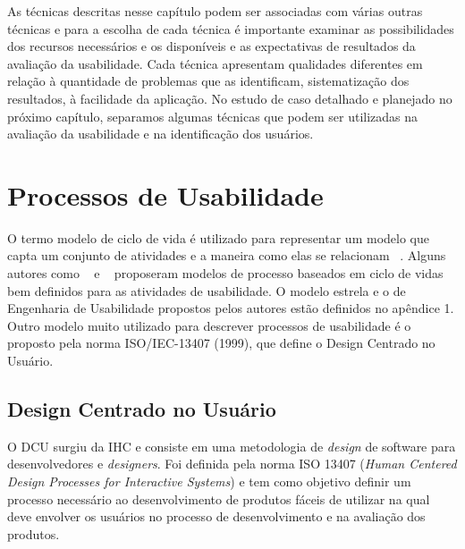 As técnicas descritas nesse capítulo podem ser associadas com várias outras técnicas e para a escolha de cada técnica é importante examinar as possibilidades dos recursos necessários e os disponíveis e as expectativas de resultados da avaliação da usabilidade. Cada técnica apresentam qualidades diferentes em relação à quantidade de problemas que as identificam, sistematização dos resultados, à facilidade da aplicação. 
%
No estudo de caso detalhado e planejado no próximo capítulo, separamos algumas técnicas que podem ser utilizadas na avaliação da usabilidade e na identificação dos usuários. 





\section{Processos de Usabilidade}


	O termo modelo de ciclo de vida é utilizado para representar um modelo que capta um conjunto de atividades e a maneira como elas se relacionam ~\cite{preece2007}. Alguns autores como ~ e ~ proposeram modelos de processo baseados em ciclo de vidas bem definidos para as atividades de usabilidade. O modelo estrela e o de Engenharia de Usabilidade propostos pelos autores estão definidos no apêndice 1. 
	Outro modelo muito utilizado para descrever processos de usabilidade é o proposto pela norma ISO/IEC-13407 (1999), que define o Design Centrado no Usuário.


\subsection{Design Centrado no Usuário}

O DCU surgiu da IHC e consiste em uma metodologia de \emph{design} de software para desenvolvedores e \emph{designers}. Foi definida pela norma ISO 13407 (\textit{Human Centered Design Processes for Interactive Systems}) e tem como objetivo definir um processo necessário ao desenvolvimento de produtos fáceis de utilizar na qual deve envolver os usuários no processo de desenvolvimento e na avaliação dos produtos.

